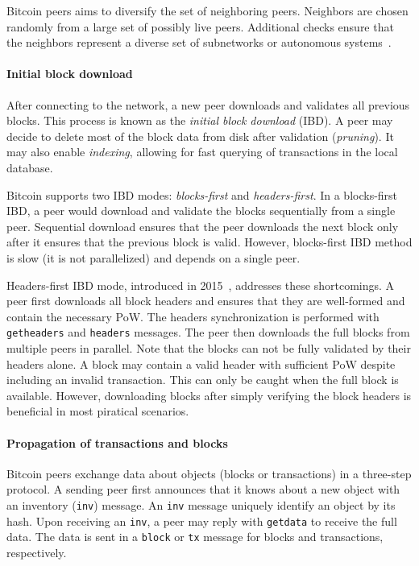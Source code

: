 Bitcoin peers aims to diversify the set of neighboring peers.
Neighbors are chosen randomly from a large set of possibly live peers.
Additional checks ensure that the neighbors represent a diverse set of subnetworks or autonomous systems~\cite{Naumenko2019a}.


\paragraph{Initial block download}

After connecting to the network, a new peer downloads and validates all previous blocks.
This process is known as the \textit{initial block download} (IBD).
A peer may decide to delete most of the block data from disk after validation (\textit{pruning}).
It may also enable \textit{indexing}, allowing for fast querying of transactions in the local database.

Bitcoin supports two IBD modes: \textit{blocks-first} and \textit{headers-first}.
In a blocks-first IBD, a peer would download and validate the blocks sequentially from a single peer.
Sequential download ensures that the peer downloads the next block only after it ensures that the previous block is valid.
However, blocks-first IBD method is slow (it is not parallelized) and depends on a single peer.

Headers-first IBD mode, introduced in 2015~\cite{Core2015}, addresses these shortcomings.
A peer first downloads all block headers and ensures that they are well-formed and contain the necessary PoW.
The headers synchronization is performed with \texttt{getheaders} and \texttt{headers} messages.
The peer then downloads the full blocks from multiple peers in parallel.
Note that the blocks can not be fully validated by their headers alone.
A block may contain a valid header with sufficient PoW despite including an invalid transaction.
This can only be caught when the full block is available.
However, downloading blocks after simply verifying the block headers is beneficial in most piratical scenarios.


\paragraph{Propagation of transactions and blocks}

Bitcoin peers exchange data about objects (blocks or transactions) in a three-step protocol.
A sending peer first announces that it knows about a new object with an inventory (\texttt{inv}) message.
An \texttt{inv} message uniquely identify an object by its hash.
Upon receiving an \texttt{inv}, a peer may reply with \texttt{getdata} to receive the full data.
The data is sent in a \texttt{block} or \texttt{tx} message for blocks and transactions, respectively.

